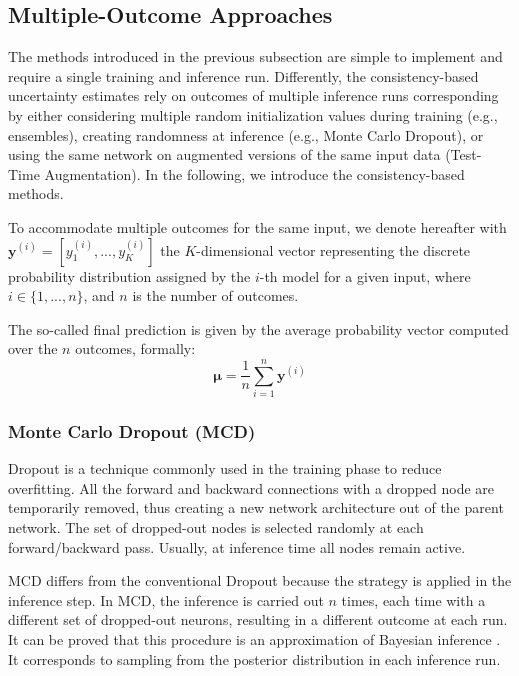 


\subsection{Multiple-Outcome Approaches}

The methods introduced in the previous subsection are simple to implement and require a single training and inference run. Differently, the consistency-based uncertainty estimates rely on outcomes of multiple inference runs corresponding by either considering multiple random initialization values during training (e.g., ensembles), creating randomness at inference (e.g., Monte Carlo Dropout), or using the same network on augmented versions of the same input data (Test-Time Augmentation). In the following, we introduce the consistency-based methods.

To accommodate multiple outcomes for the same input, we denote hereafter with $\textbf{y}^{(i)}=[ y_1^{(i)},..., y_K^{(i)}]$ the $K$-dimensional vector representing the discrete probability distribution assigned by the $i$-th model for a given input, where $i \in \{1,...,n\}$, and $n$ is the number of outcomes.

The so-called final prediction is given by the average probability vector computed over the $n$ outcomes, formally:
 \begin{equation} \label{eq:FinalPrediction}
 \boldsymbol{\mu}
 =\frac{1}{n}\sum_{i=1}^{n}{\textbf{y}^{(i)}}
 \end{equation}

\bigskip
\noindent
\subsubsection{Monte Carlo Dropout (MCD)}

Dropout is a technique commonly used in the training phase to reduce overfitting. All the forward and backward connections with a dropped node are temporarily removed, thus creating a new network architecture out of the parent network. The set of dropped-out nodes is selected randomly at each forward/backward pass. Usually, at inference time all nodes remain active. 

MCD differs from the conventional Dropout because the strategy is applied in the inference step. In MCD, the inference is carried out $n$ times, each time with a different set of dropped-out neurons, resulting in a different outcome at each run. 
 It can be proved that this procedure is an approximation of Bayesian inference \cite{gal2016dropout}. It corresponds to sampling from the posterior distribution in each inference run.  %

